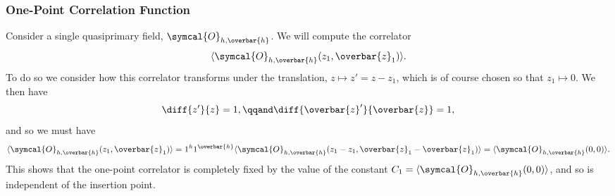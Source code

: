 \documentclass[fleqn]{NotesClass}
\newcommand{\quantumField}[1]{\symcal{#1}}
\DeclarePairedDelimiter{\correlator}{\langle}{\rangle}
\begin{document}
    \subsubsection{One-Point Correlation Function}
    Consider a single quasiprimary field, \(\quantumField{O}_{h,\overbar{h}}\).
    We will compute the correlator
    \begin{equation}
        \correlator{\quantumField{O}_{h,\overbar{h}}(z_1, \overbar{z}_1)}.
    \end{equation}
    To do so we consider how this correlator transforms under the translation, \(z \mapsto z' = z - z_1\), which is of course chosen so that \(z_1 \mapsto 0\).
    We then have
    \begin{equation}
        \diff{z'}{z} = 1, \qqand \diff{\overbar{z}'}{\overbar{z}} = 1,
    \end{equation}
    and so we must have
    \begin{equation}
        \correlator{\quantumField{O}_{h,\overbar{h}}(z_1, \overbar{z}_1)} = 1^h 1^{\overbar{h}} \correlator{\quantumField{O}_{h,\overbar{h}}(z_1 - z_1, \overbar{z}_1 - \overbar{z}_1)} = \correlator{\quantumField{O}_{h,\overbar{h}}(0, 0)}.
    \end{equation}
    This shows that the one-point correlator is completely fixed by the value of the constant \(C_1 = \correlator{\quantumField{O}_{h,\overbar{h}}(0, 0)}\), and so is independent of the insertion point.
    
\end{document}

